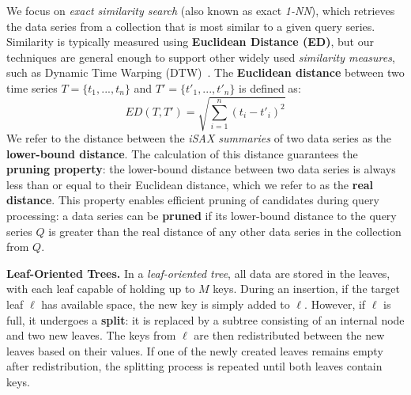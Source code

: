 \documentclass[a4paper,11pt,twoside,openany]{book}
\begin{document}
We focus on \textit{exact similarity search} (also known as exact \textit{1-NN}),  
which retrieves the data series from a collection that is most similar to a given 
query series. Similarity is typically measured using \textbf{Euclidean Distance (ED)},
but our techniques are general enough to support other widely used 
\textit{similarity measures}, such as Dynamic Time Warping (DTW)~\cite{rakthanmanon2012searching}.  
% 
The \textbf{Euclidean distance} between two time series  
\( T = \{t_1, ... , t_n\} \) and \( T' = \{t'_1, ... , t'_n\} \)  
is defined as:  
\[
ED(T, T') = \sqrt{\sum_{i=1}^{n} (t_i - t'_i)^2}
\]  
% 
We refer to the distance between the \textit{iSAX summaries} of two data series  
as the \textbf{lower-bound distance}.  
The calculation of this distance guarantees the \textbf{pruning property}:  
the lower-bound distance between two data series is always less than or equal to  
their Euclidean distance, which we refer to as the \textbf{real distance}.  
% 
This property enables efficient pruning of candidates during query processing:  
a data series can be \textbf{pruned} if its lower-bound distance to the query series
\( Q \) is greater than the real distance of any other data series in the collection 
from \( Q \).

\noindent
{\bf Leaf-Oriented Trees.}  
In a \textit{leaf-oriented tree}, all data are stored in the leaves, with each leaf
capable of holding up to \( M \) keys.  
% 
During an insertion, if the target leaf \( \ell \) has available space,  
the new key is simply added to \( \ell \).  
However, if \( \ell \) is full, it undergoes a \textbf{split}: it is replaced 
by a subtree consisting of an internal node and two new leaves.  
The keys from \( \ell \) are then redistributed between the new leaves based on
their values.  
% 
If one of the newly created leaves remains empty after redistribution,  
the splitting process is repeated until both leaves contain keys.  
\end{document}
